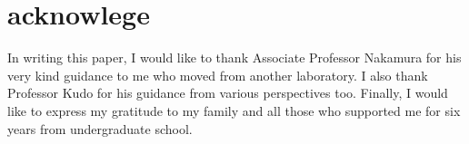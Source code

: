\section*{acknowlege}
In writing this paper, 
I would like to thank Associate Professor Nakamura for his very kind guidance 
to me who moved from another laboratory.
I also thank Professor Kudo for his guidance from various perspectives too.
Finally, I would like to express my gratitude to my family and 
all those who supported me for six years from undergraduate school.


